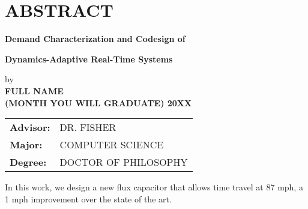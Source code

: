 \section*{ABSTRACT}

\centerline{\bf Demand Characterization and Codesign of }
\vspace{-0.4cm}
\centerline{\bf Dynamics-Adaptive Real-Time Systems}

{\setlength\baselineskip{0.3in}
\begin{center}
by\\
\medskip
{\bf FULL NAME}\\
\medskip
{\bf (MONTH YOU WILL GRADUATE) 20XX}\\
\end{center}
\Vspc
\begin{tabular}{ll}
	{\bf Advisor:} & DR. FISHER \\
	{\bf Major:} & COMPUTER SCIENCE \\
	{\bf Degree:} & DOCTOR OF PHILOSOPHY
\end{tabular}
}

\bigskip \bigskip

In this work, we design a new flux capacitor that allows time travel at 87 mph, a 1 mph improvement over the state of the art.